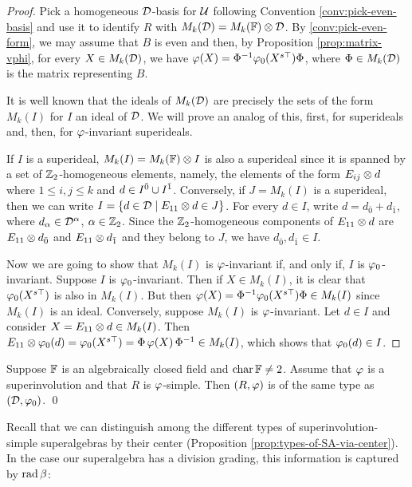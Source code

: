 \begin{proof}
	Pick a homogeneous $\mathcal{D}$-basis for $\mathcal U$ following Convention \ref{conv:pick-even-basis} and use it to identify $R$ with $M_k(\mathcal{D}) = M_k(\mathbb{F}) \otimes \mathcal{D}$.
	By \cref{conv:pick-even-form}, we may assume that $B$ is even and then,
	by Proposition \ref{prop:matrix-vphi}, for every $X \in M_k(\mathcal{D})$, we have
	$\varphi(X) = \Phi^{-1} \varphi_0(X^{s\top}) \Phi$, where $\Phi \in M_k(\mathcal{D})$ is the matrix representing $B$. 

	It is well known that the ideals of $M_k(\mathcal{D})$ are precisely the sets of the form $M_k(I)$ for $I$ an ideal of $\mathcal{D}$.
	We will prove an analog of this, first, for superideals and, then, for $\varphi$-invariant superideals.

	If $I$ is a superideal, $M_k(I) = M_k(\mathbb{F}) \otimes I$ is also a superideal since it is spanned by a set of $\mathbb{Z}_2$-homogeneous elements, namely, the elements of the form $E_{ij}\otimes d$ where $1 \leq i,j \leq k$ and $d \in I^{\bar0} \cup I^{\bar1}$.
	Conversely, if $J = M_k(I)$ is a superideal, then we can write $I = \{ d\in  \mathcal{D} \mid E_{11}\otimes d \in J\}$.
	For every $d\in I$, write $d = d_{\bar 0} + d_{\bar 1}$, where $d_\alpha \in \mathcal{D}^\alpha$, $\alpha \in \mathbb{Z}_2$.
	Since the $\mathbb{Z}_2$-homogeneous components of $E_{11}\otimes d$ are $E_{11}\otimes d_{\bar 0}$ and $E_{11}\otimes d_{\bar 1}$ and they belong to $J$, we have $d_{\bar 0}, d_{\bar 1} \in I$.

	Now we are going to show that $M_k(I)$ is $\varphi$-invariant if, and only if, $I$ is $\varphi_0$-invariant.
	Suppose $I$ is $\varphi_0$-invariant.
	Then if $X \in M_k(I)$, it is clear that $\varphi_0 (X^{s\top})$ is also in $M_k(I)$.
	But then $\varphi(X) = \Phi^{-1} \varphi_0(X^{s\top}) \Phi \in M_k(I)$ since $M_k(I)$ is an ideal.
	Conversely, suppose $M_k(I)$ is $\varphi$-invariant.
	Let $d \in I$ and consider $X = E_{11} \otimes d \in M_k(I)$.
	Then $E_{11} \otimes \varphi_0(d) = \varphi_0(X^{s\top}) = \Phi\, \varphi(X)\, \Phi^{-1} \in M_k(I)$, which shows that $\varphi_0(d) \in I$.
\end{proof}

\begin{cor}\label{cor:D-has-the-same-type}
	Suppose $\mathbb{F}$ is an algebraically closed field and $\operatorname{char} \mathbb{F} \neq 2$.
	Assume that $\varphi$ is a superinvolution and that $R$ is $\varphi$-simple.
	Then $(R, \varphi)$ is of the same type as $(\mathcal{D}, \varphi_0)$. \qed
\end{cor}


Recall that we can distinguish among the different types of superinvolution-simple superalgebras by their center (Proposition \ref{prop:types-of-SA-via-center}).
In the case our superalgebra has a division grading, this information is captured by $\operatorname{rad} \beta$:

